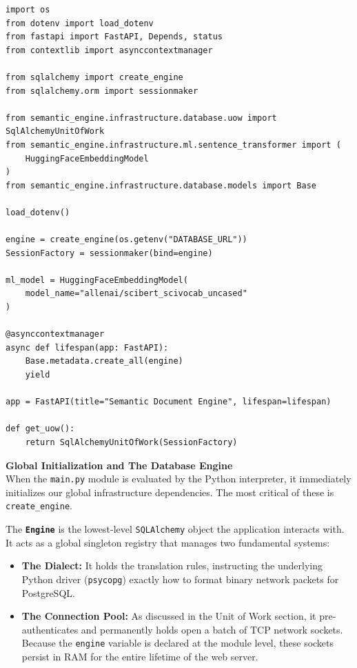 \begin{lstlisting}[caption={Global Setup and Adapter Initialization}]
import os
from dotenv import load_dotenv
from fastapi import FastAPI, Depends, status
from contextlib import asynccontextmanager

from sqlalchemy import create_engine
from sqlalchemy.orm import sessionmaker

from semantic_engine.infrastructure.database.uow import SqlAlchemyUnitOfWork
from semantic_engine.infrastructure.ml.sentence_transformer import (
    HuggingFaceEmbeddingModel
)
from semantic_engine.infrastructure.database.models import Base

load_dotenv()

engine = create_engine(os.getenv("DATABASE_URL"))
SessionFactory = sessionmaker(bind=engine)

ml_model = HuggingFaceEmbeddingModel(
    model_name="allenai/scibert_scivocab_uncased"
)

@asynccontextmanager
async def lifespan(app: FastAPI):
    Base.metadata.create_all(engine)
    yield

app = FastAPI(title="Semantic Document Engine", lifespan=lifespan)

def get_uow():
    return SqlAlchemyUnitOfWork(SessionFactory)
\end{lstlisting}

\textbf{Global Initialization and The Database Engine} \\
When the \texttt{main.py} module is evaluated by the Python interpreter, it immediately initializes our global infrastructure dependencies. The most critical of these is \texttt{create\_engine}.

The \textbf{\texttt{Engine}} is the lowest-level \texttt{SQLAlchemy} object the application interacts with. It acts as a global singleton registry that manages two fundamental systems:
\begin{itemize}
    \item \textbf{The Dialect:} It holds the translation rules, instructing the underlying Python driver (\texttt{psycopg}) exactly how to format binary network packets for PostgreSQL.
    \item \textbf{The Connection Pool:} As discussed in the Unit of Work section, it pre-authenticates and permanently holds open a batch of TCP network sockets. Because the \texttt{engine} variable is declared at the module level, these sockets persist in RAM for the entire lifetime of the web server.
\end{itemize}

